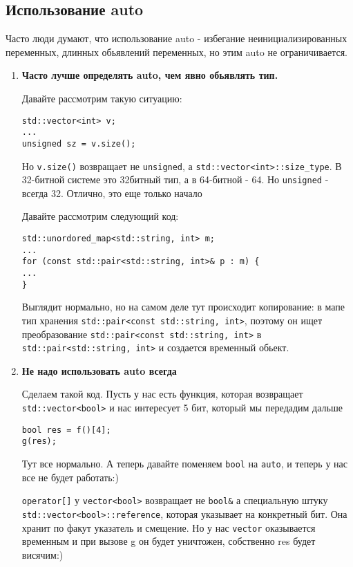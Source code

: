 	\subsection{Использование auto}
	Часто люди думают, что использование auto - избегание неинициализированных переменных, длинных обьявлений переменных, но этим auto не ограничивается.
	\begin{enumerate}
		\item \textbf{Часто лучше определять auto, чем явно обьявлять тип.}
	
		Давайте рассмотрим такую ситуацию:
\begin{verbatim}
std::vector<int> v;
...
unsigned sz = v.size();
\end{verbatim}
		Но \texttt{v.size()} возвращает не \texttt{unsigned}, а \texttt{std::vector<int>::size_type}. В 32-битной системе это 32битный тип, а в 64-битной - 64. Но \texttt{unsigned} - всегда 32.
		Отлично, это еще только начало
		
		Давайте рассмотрим следующий код:
\begin{verbatim}
std::unordored_map<std::string, int> m;
...
for (const std::pair<std::string, int>& p : m) {
...
}
\end{verbatim}
		Выглядит нормально, но на самом деле тут происходит копирование: в мапе тип хранения \texttt{std::pair<const std::string, int>}, поэтому он ищет преобразование \texttt{std::pair<const std::string, int>} в \texttt{std::pair<std::string, int>} и создается временный обьект.
		
	    \item \textbf{Не надо использовать auto всегда}
	    
		Сделаем такой код. Пусть у нас есть функция, которая возвращает \texttt{std::vector<bool>} и нас интересует 5 бит, который мы передадим дальше
\begin{verbatim}
bool res = f()[4];
g(res);
\end{verbatim}
		Тут все нормально. А теперь давайте поменяем \texttt{bool} на \texttt{auto}, и теперь у нас все не будет работать:)
		
		\texttt{operator[]} у \texttt{vector<bool>} возвращает не \texttt{bool&} а специальную штуку \texttt{std::vector<bool>::reference}, которая указывает на конкретный бит. Она хранит по факут указатель и смещение. Но у нас \texttt{vector} оказывается временным и при вызове g он будет уничтожен, собственно res будет висячим:)
		

\end{enumerate}
